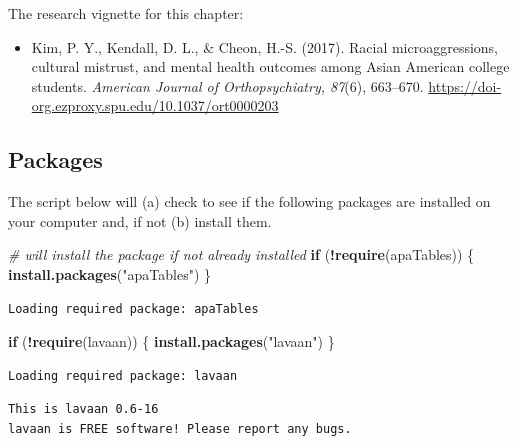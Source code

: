 \documentclass[
  11pt,
]{book}
\newenvironment{Shaded}{\begin{snugshade}}{\end{snugshade}}
\newcommand{\CommentTok}[1]{\textcolor[rgb]{0.37,0.37,0.37}{\textit{#1}}}
\newcommand{\ControlFlowTok}[1]{\textcolor[rgb]{0.27,0.27,0.27}{\textbf{#1}}}
\newcommand{\FunctionTok}[1]{\textcolor[rgb]{0.27,0.27,0.27}{\textbf{#1}}}
\newcommand{\NormalTok}[1]{#1}
\newcommand{\SpecialCharTok}[1]{\textcolor[rgb]{0.43,0.43,0.43}{\textbf{#1}}}
\newcommand{\StringTok}[1]{\textcolor[rgb]{0.5,0.5,0.5}{#1}}
\providecommand{\tightlist}{%
  \setlength{\itemsep}{0pt}\setlength{\parskip}{0pt}}
\begin{document}
The research vignette for this chapter:

\begin{itemize}
\tightlist
\item
  Kim, P. Y., Kendall, D. L., \& Cheon, H.-S. (2017). Racial microaggressions, cultural mistrust, and mental health outcomes among Asian American college students. \emph{American Journal of Orthopsychiatry, 87}(6), 663--670. \url{https://doi-org.ezproxy.spu.edu/10.1037/ort0000203}
\end{itemize}

\hypertarget{packages-6}{%
\subsection{Packages}\label{packages-6}}

The script below will (a) check to see if the following packages are installed on your computer and, if not (b) install them.

\begin{Shaded}
\begin{Highlighting}[]
\CommentTok{\# will install the package if not already installed}
\ControlFlowTok{if}\NormalTok{ (}\SpecialCharTok{!}\FunctionTok{require}\NormalTok{(apaTables)) \{}
    \FunctionTok{install.packages}\NormalTok{(}\StringTok{"apaTables"}\NormalTok{)}
\NormalTok{\}}
\end{Highlighting}
\end{Shaded}

\begin{verbatim}
Loading required package: apaTables
\end{verbatim}

\begin{Shaded}
\begin{Highlighting}[]
\ControlFlowTok{if}\NormalTok{ (}\SpecialCharTok{!}\FunctionTok{require}\NormalTok{(lavaan)) \{}
    \FunctionTok{install.packages}\NormalTok{(}\StringTok{"lavaan"}\NormalTok{)}
\NormalTok{\}}
\end{Highlighting}
\end{Shaded}

\begin{verbatim}
Loading required package: lavaan
\end{verbatim}

\begin{verbatim}
This is lavaan 0.6-16
lavaan is FREE software! Please report any bugs.
\end{verbatim}
\end{document}
